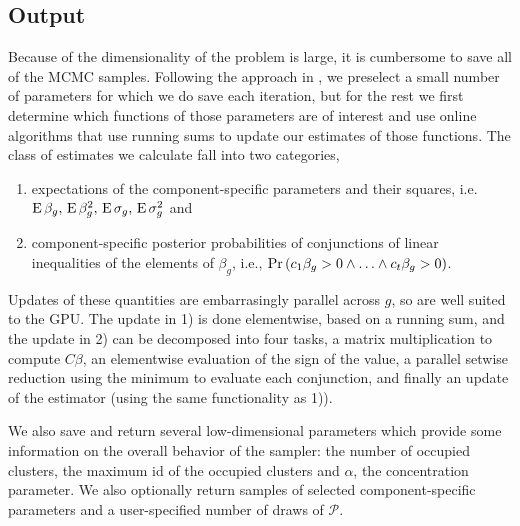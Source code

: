 {%


\subsection{Output}
\label{subsec:output}
Because of the dimensionality of the problem is large, it is cumbersome to save all of the MCMC samples. Following the approach in \citet{landau}, we preselect a small number of parameters for which we do save each iteration, but for the rest we first determine which functions of those parameters are of interest and use online algorithms that use running sums to update our estimates of those functions. The class of estimates we calculate fall into two categories,
\begin{enumerate}
\item expectations of the component-specific parameters and their squares, i.e. $\operatorname{E} \beta_g,\, \operatorname{E} \beta_g^2,\, \operatorname{E}\sigma_g,\, \operatorname{E}\sigma_g^2$ and 
\item component-specific posterior probabilities of conjunctions of linear
  inequalities of the elements of $\beta_g$, i.e.,
  $\operatorname{Pr}\left(c_1\beta_g > 0 \land \ldots \land c_t\beta_g > 0\right)$.
\end{enumerate}
Updates of these quantities are embarrasingly parallel across $g$, so are well suited to the GPU. The update in 1) is done elementwise, based on a running sum, and the update in 2) can be decomposed into four tasks, a matrix multiplication to compute $C\beta$, an elementwise evaluation of the sign of the value, a parallel setwise reduction using the minimum to evaluate each conjunction, and finally an update of the estimator (using the same functionality as 1)).

We also save and return several low-dimensional parameters which provide some information on the overall behavior of the sampler: the number of occupied clusters, the maximum id of the occupied clusters and $\alpha$, the concentration parameter. We also optionally return samples of selected component-specific parameters and a user-specified number of draws of $\mathcal{P}$.


}
